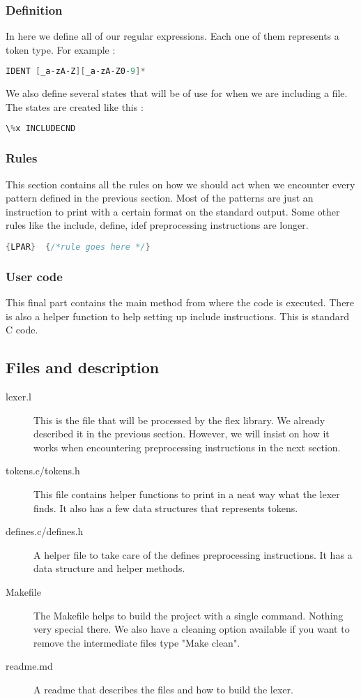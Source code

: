 \documentclass{article}
\begin{document}
\subsubsection{Definition}
In here we define all of our regular expressions. Each one of them represents a token type. For example : 
\begin{lstlisting}[language=C]
IDENT [_a-zA-Z][_a-zA-Z0-9]*
\end{lstlisting}
 
We also define several states that will be of use for when we are including a file. The states are created like this : 
\begin{lstlisting}[language=C]
\%x INCLUDECND
\end{lstlisting}
\subsubsection{Rules}
This section contains all the rules on how we should act when we encounter every pattern defined in the previous section. Most of the patterns are just an instruction to print with a certain format on the standard output. 
Some other rules like the include, define, idef preprocessing instructions are longer. 
\begin{lstlisting}[language=C]
{LPAR}  {/*rule goes here */}
\end{lstlisting}
\subsubsection{User code}
This final part contains the main method from where the code is executed. There is also a helper function to help setting up include instructions. 
This is standard C code. 


\subsection{Files and description}
\label{definition}
\begin{description}
\item[lexer.l]
This is the file that will be processed by the flex library. We already described it in the previous section. However, we will insist on how it works when encountering preprocessing instructions in the next section. 
\item[tokens.c/tokens.h]
This file contains helper functions to print in a neat way what the lexer finds. It also has a few data structures that represents tokens. 
\item[defines.c/defines.h]
A helper file to take care of the defines preprocessing instructions. It has a data structure and helper methods.
\item[Makefile]
The Makefile helps to build the project with a single command. Nothing very special there. We also have a cleaning option available if you want to remove the intermediate files type "Make clean". 
\item[readme.md]
A readme that describes the files and how to build the lexer. 
\end{description}
\end{document}
